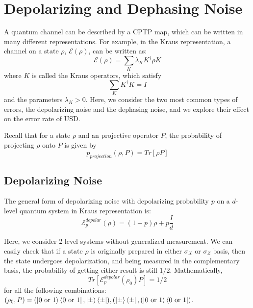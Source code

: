\documentclass[%
 reprint,
superscriptaddress,
 amsmath,amssymb,
 aps,
]{revtex4-2}
\begin{document}
\appendix

\section{Depolarizing and Dephasing Noise}
\label{sec:Depolarizing_and_Dephasing_Noise}

A quantum channel can be described by a CPTP map, which can be written in many different representations. For example, in the Kraus representation, a channel on a state $\rho$, $\mathcal{E}(\rho)$, can be written as:
\begin{equation}
    \mathcal{E}(\rho)=\sum_K \lambda_K K^\dagger\rho K
\end{equation}
where $K$ is called the Kraus operators, which satisfy 
\begin{equation}
    \sum_KK^\dagger K=I
\end{equation}
and the parameters $\lambda_K>0$.
Here, we consider the two most common types of errors, the depolarizing noise and the dephasing noise, and we explore their effect on the error rate of USD.

Recall that for a state $\rho$ and an projective operator $P$, the probability of projecting $\rho$ onto $P$ is given by
\begin{equation}
    p_{projection}(\rho, P)=Tr[\rho P]
\end{equation}

\subsection{Depolarizing Noise}
The general form of depolarizing noise with depolarizing probability $p$ on a $d$-level quantum system in Kraus representation is:
\begin{equation}
    \mathcal{E}^{depolar}_{p}(\rho)=(1-p)\rho+p\frac{I}{d}
\end{equation}

Here, we consider 2-level systems without generalized measurement. We can easily check that if a state $\rho$ is originally prepared in either $\sigma_X$ or $\sigma_Z$ basis, then the state undergoes depolarization, and being measured in the complementary basis, the probability of getting either result is still $1/2$. Mathematically, 
\begin{equation}
    Tr[\mathcal{E}^{depolar}_p(\rho_0)P]=1/2
\end{equation}
for all the following combinations: $(\rho_0, P)=(\ket{0\text{ or }1}\bra{0\text{ or }1}, \ket{\pm}\bra{\pm}), (\ket{\pm}\bra{\pm}, (\ket{0\text{ or }1}\bra{0\text{ or }1})$.
\end{document}
